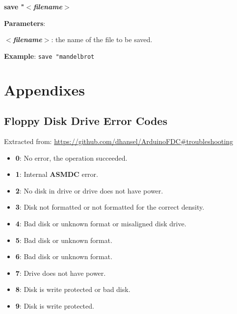 \documentclass[a4paper,11pt]{article}
\begin{document}
    \hspace{1.9cm}\textbf{save "\textit{$<$filename$>$}}

    \textbf{Parameters}:

    \hspace{1cm}\textbf{\textit{$<$filename$>$}}: the name of the file to be
    saved.

    \textbf{Example}: \texttt{save "mandelbrot}

    \pagebreak
    \section{Appendixes}
    \label{sec:appendixes}

    \subsection{Floppy Disk Drive Error Codes}

    Extracted from: \url{https://github.com/dhansel/ArduinoFDC#troubleshooting}

    \begin{itemize}
        \item \textbf{0}: No error, the operation succeeded.
        \item \textbf{1}: Internal \textbf{ASMDC} error.
        \item \textbf{2}: No disk in drive or drive does not have power.
        \item \textbf{3}: Disk not formatted or not formatted for the correct
        density.
        \item \textbf{4}: Bad disk or unknown format or misaligned disk drive.
        \item \textbf{5}: Bad disk or unknown format.
        \item \textbf{6}: Bad disk or unknown format.
        \item \textbf{7}: Drive does not have power.
        \item \textbf{8}: Disk is write protected or bad disk.
        \item \textbf{9}: Disk is write protected.
    \end{itemize}
\end{document}
